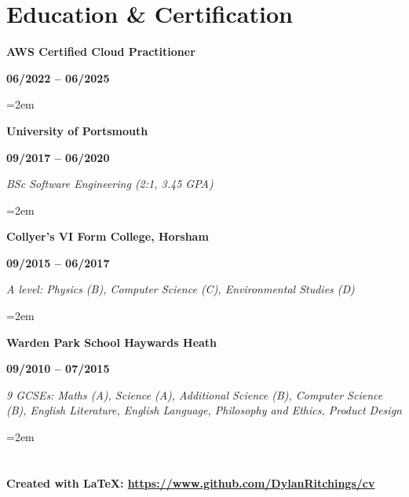 \documentclass[12pt]{article}
\newcommand{\education}[4]{

  \noindent  \textbf{#1}
    \hfill 
    \parbox{9em}{%
    \centering\textbf{#2}} \par
    \vspace*{0.5em} 
     \noindent \textit{#3} \par
     \vspace*{1em}
     \noindent\hangindent=2em\hangafter=0 \small #4 
\normalsize \par}
\begin{document}
\section*{Education \& Certification}

\education{AWS Certified Cloud Practitioner} {06/2022 -- 06/2025} {} {}
\education{University of Portsmouth} {09/2017 -- 06/2020} {BSc Software Engineering (2:1, 3.45 GPA)} {}
\education{Collyer's VI Form College, Horsham} {09/2015 -- 06/2017} {A level: Physics (B), Computer Science (C), Environmental Studies (D)} {}
\education{Warden Park School Haywards Heath} {09/2010 -- 07/2015} {9 GCSEs: Maths (A), Science (A), Additional Science (B), Computer Science (B), English Literature, English Language, Philosophy and Ethics, Product Design} {}

\section*{}
\paragraph {Created with \LaTeX: \url{https://www.github.com/DylanRitchings/cv}}
\end{document}
